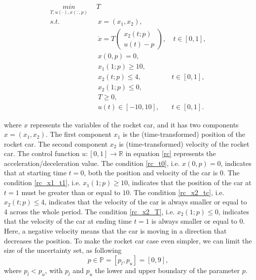 \documentclass  [
  paper    = a4,
  BCOR     = 10mm,
  twoside,
  fontsize = 12pt,
  fleqn,
  toc      = bibnumbered,
  toc      = listofnumbered,
  numbers  = noendperiod,
  headings = normal,
  listof   = leveldown,
  version  = 3.03
]                                       {scrreprt}
\newcommand{\<}{\langle}
\renewcommand{\>}{\rangle}
\begin{document}
\begin{subequations}
	\begin{align}
		\underset{T, u(\cdot), x(:,p)}{min} \   & \  T \\ 
		s.t.  & \ \ x = (x_1, x_2),   \label{rc_x} \\ 
		& \ \  \dot{x} = T  \begin{pmatrix}  x_2(t;p) \\ u(t)-p   \end{pmatrix}, & \ t \in [0,1],  \label{rc_partial} \\
		& \ \ x(0,p) = 0, \label{rc_t0}\\
		& \ \ x_1(1;p) \geq 10, \label{rc_x1_t1} \\
		& \ \ x_2(t;p) \leq 4, & t \in [0,1], \label{rc_x2_tc} \\
		& \ \ x_2(1;p) \leq 0, \label{rc_x2_T}  \\
		& \ \ T \geq 0, \\
		& \ \ u(t) \in [-10, 10], & t \in [0,1]. 
	\end{align}
	\label{rc}
\end{subequations}

where $x$ represents the variables of the rocket car, and it has two components $ x = (x_1, x_2)$. The first component $x_1$ is the (time-transformed) position of the rocket car. The second component $x_2$ is (time-transformed) velocity of the rocket car. The control function $ u: [0,1] \rightarrow \mathbb{R}$ in equation \ref{rc} represents the acceleration/deceleration value. The condition \ref{rc_t0}, i.e. $x(0,p) = 0$, indicates that at starting time $t=0$, both the position and velocity of the car is $0$. The condition \ref{rc_x1_t1}, i.e. $x_1(1;p) \geq 10$, indicates that the position of the car at $t=1$ must be greater than or equal to $10$. The condition \ref{rc_x2_tc}, i.e. $x_2(t;p) \leq 4$, indicates that the velocity of the car is always smaller or equal to 4 across the whole period. The condition \ref{rc_x2_T}, i.e. $x_2(1;p) \leq 0$, indicates that the velocity of the car at ending time $t=1$ is always smaller or equal to $0$.  Here, a negative velocity means that the car is moving in a direction that decreases the position.  To make the rocket car case even simpler, we can limit the size of the uncertainty set, as following
\begin{equation}
	p \in \mathbb{P} = [p_l, p_u] = [0,9],
	\label{uncertainP}
\end{equation}
where $p_l < p_u$, with $p_l$ and $p_u$ the lower and upper boundary of the parameter $p$. 
\end{document}

